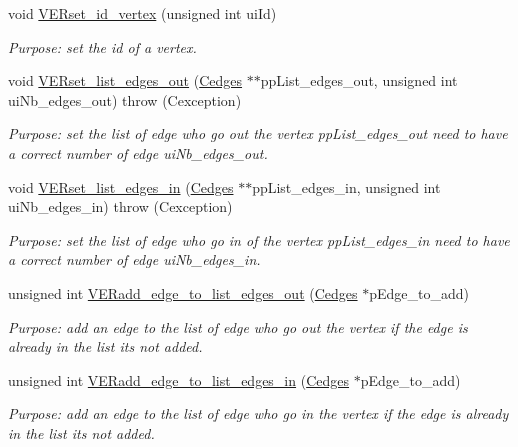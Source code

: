 \begin{DoxyCompactItemize}
void \hyperlink{class_cvertex_a6d76189e22c29a74cbae5a9a3507c312}{V\+E\+Rset\+\_\+id\+\_\+vertex} (unsigned int ui\+Id)
\begin{DoxyCompactList}\small\item\em Purpose\+: set the id of a vertex. \end{DoxyCompactList}\item 
void \hyperlink{class_cvertex_a0816cd7d37fe2ae4e6d347c98b5d603c}{V\+E\+Rset\+\_\+list\+\_\+edges\+\_\+out} (\hyperlink{class_cedges}{Cedges} $\ast$$\ast$pp\+List\+\_\+edges\+\_\+out, unsigned int ui\+Nb\+\_\+edges\+\_\+out)  throw (\+Cexception)
\begin{DoxyCompactList}\small\item\em Purpose\+: set the list of edge who go out the vertex pp\+List\+\_\+edges\+\_\+out need to have a correct number of edge ui\+Nb\+\_\+edges\+\_\+out. \end{DoxyCompactList}\item 
void \hyperlink{class_cvertex_a08f128a8c3988e24e62806f6655b4a37}{V\+E\+Rset\+\_\+list\+\_\+edges\+\_\+in} (\hyperlink{class_cedges}{Cedges} $\ast$$\ast$pp\+List\+\_\+edges\+\_\+in, unsigned int ui\+Nb\+\_\+edges\+\_\+in)  throw (\+Cexception)
\begin{DoxyCompactList}\small\item\em Purpose\+: set the list of edge who go in of the vertex pp\+List\+\_\+edges\+\_\+in need to have a correct number of edge ui\+Nb\+\_\+edges\+\_\+in. \end{DoxyCompactList}\item 
unsigned int \hyperlink{class_cvertex_ac2a86a2638f4b4ac43c9937aa76671a8}{V\+E\+Radd\+\_\+edge\+\_\+to\+\_\+list\+\_\+edges\+\_\+out} (\hyperlink{class_cedges}{Cedges} $\ast$p\+Edge\+\_\+to\+\_\+add)
\begin{DoxyCompactList}\small\item\em Purpose\+: add an edge to the list of edge who go out the vertex if the edge is already in the list it\textquotesingle{}s not added. \end{DoxyCompactList}\item 
unsigned int \hyperlink{class_cvertex_a49f2c7dde7f059ba1a03f60cac1dbecf}{V\+E\+Radd\+\_\+edge\+\_\+to\+\_\+list\+\_\+edges\+\_\+in} (\hyperlink{class_cedges}{Cedges} $\ast$p\+Edge\+\_\+to\+\_\+add)
\begin{DoxyCompactList}\small\item\em Purpose\+: add an edge to the list of edge who go in the vertex if the edge is already in the list it\textquotesingle{}s not added. \end{DoxyCompactList}\item 

\end{DoxyCompactItemize}
